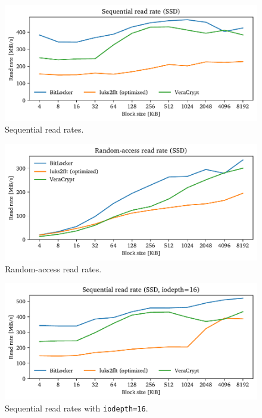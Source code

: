 \begin{figure}[htb!]
	\center
	\includegraphics[scale=1]{../fig/performance.hwexperiments.optseq.pdf}
	\caption[
		Sequential read rates
	]{
		Sequential read rates. 
	}
	\label{fig:performance.hwexperiments.optseq}
\end{figure}

\begin{figure}[htb!]
	\center
	\includegraphics[scale=1]{../fig/performance.hwexperiments.optrand.pdf}
	\caption[
		Random-access read rates
	]{
		Random-access read rates. 
	}
	\label{fig:performance.hwexperiments.optrand}
\end{figure}

\begin{figure}[htb!]
	\center
	\includegraphics[scale=1]{../fig/performance.hwexperiments.optseqqueue.pdf}
	\caption[
		Sequential read rates with \texttt{iodepth=16}
	]{
		Sequential read rates with \texttt{iodepth=16}. 
	}
	\label{fig:performance.hwexperiments.optseqqueue}
\end{figure}

